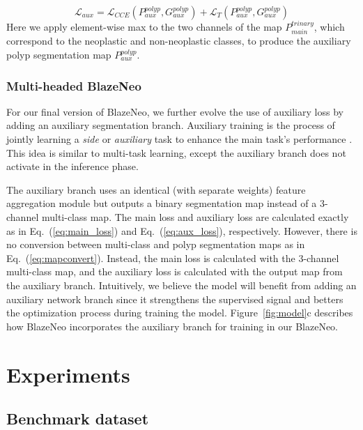 \documentclass{ieeeaccess}
\newcommand{\ModelName}{BlazeNeo\xspace}
\begin{document}
\begin{equation}
    \label{eq:aux_loss}
    \mathcal{L}_{aux} =  \mathcal{L}_{CCE}(P_{aux}^{polyp}, G_{aux}^{polyp}) + \mathcal{L}_{T}(P_{aux}^{polyp}, G_{aux}^{polyp})
\end{equation}
Here we apply element-wise max to the two channels of the map $P_{main}^{trinary}$, which correspond to the neoplastic and non-neoplastic classes, to produce the auxiliary polyp segmentation map $P_{aux}^{polyp}$.



\subsubsection{Multi-headed \ModelName}
For our final version of \ModelName, we further evolve the use of auxiliary loss by adding an auxiliary segmentation branch.
Auxiliary training is the process of jointly learning a \textit{side} or \textit{auxiliary} task to enhance the main task's performance \cite{chennupati2019auxnet,zhang2020auxiliary}. This idea is similar to multi-task learning, except the auxiliary branch does not activate in the inference phase.


The auxiliary branch uses an identical (with separate weights) feature aggregation module but outputs a binary segmentation map instead of a 3-channel multi-class map. The main loss and auxiliary loss are calculated exactly as in Eq.~(\ref{eq:main_loss}) and Eq.~(\ref{eq:aux_loss}), respectively. However, there is no conversion between multi-class and polyp segmentation maps as in Eq.~(\ref{eq:mapconvert}). Instead, the main loss is calculated with the 3-channel multi-class map, and the auxiliary loss is calculated with the output map from the auxiliary branch. Intuitively, we believe the model will benefit from adding an auxiliary network branch since it strengthens the supervised signal and betters the optimization process during training the model. Figure~\ref{fig:model}c describes how \ModelName incorporates the auxiliary branch for training in our BlazeNeo.




\section{Experiments}
\label{sec:experiment}

\subsection{Benchmark dataset}
\end{document}
